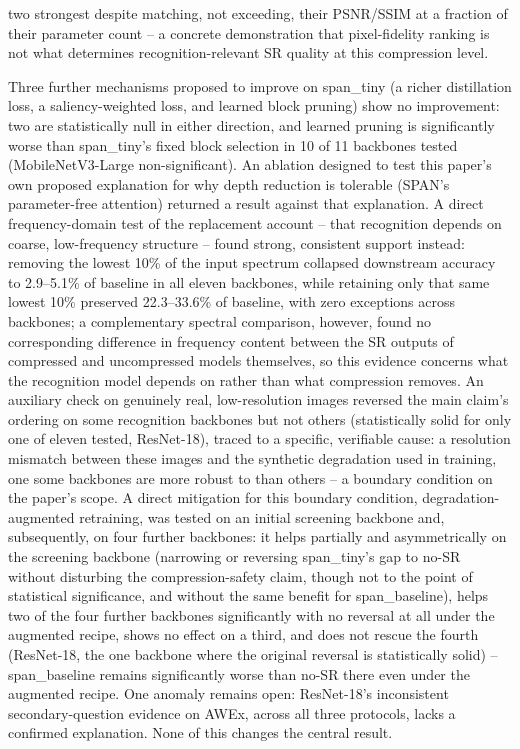 \documentclass[11pt]{article}
\begin{document}
two strongest despite matching, not exceeding, their PSNR/SSIM at a fraction of their parameter count -- a concrete demonstration that pixel-fidelity ranking is not what determines recognition-relevant SR quality at this compression level.

Three further mechanisms proposed to improve on span\_tiny (a richer distillation loss, a saliency-weighted loss, and learned block pruning) show no improvement: two are statistically null in either direction, and learned pruning is significantly worse than span\_tiny's fixed block selection in 10 of 11 backbones tested (MobileNetV3-Large non-significant). An ablation designed to test this paper's own proposed explanation for why depth reduction is tolerable (SPAN's parameter-free attention) returned a result against that explanation. A direct frequency-domain test of the replacement account -- that recognition depends on coarse, low-frequency structure -- found strong, consistent support instead: removing the lowest 10\% of the input spectrum collapsed downstream accuracy to 2.9--5.1\% of baseline in all eleven backbones, while retaining only that same lowest 10\% preserved 22.3--33.6\% of baseline, with zero exceptions across backbones; a complementary spectral comparison, however, found no corresponding difference in frequency content between the SR outputs of compressed and uncompressed models themselves, so this evidence concerns what the recognition model depends on rather than what compression removes. An auxiliary check on genuinely real, low-resolution images reversed the main claim's ordering on some recognition backbones but not others (statistically solid for only one of eleven tested, ResNet-18), traced to a specific, verifiable cause: a resolution mismatch between these images and the synthetic degradation used in training, one some backbones are more robust to than others -- a boundary condition on the paper's scope. A direct mitigation for this boundary condition, degradation-augmented retraining, was tested on an initial screening backbone and, subsequently, on four further backbones: it helps partially and asymmetrically on the screening backbone (narrowing or reversing span\_tiny's gap to no-SR without disturbing the compression-safety claim, though not to the point of statistical significance, and without the same benefit for span\_baseline), helps two of the four further backbones significantly with no reversal at all under the augmented recipe, shows no effect on a third, and does not rescue the fourth (ResNet-18, the one backbone where the original reversal is statistically solid) -- span\_baseline remains significantly worse than no-SR there even under the augmented recipe. One anomaly remains open: ResNet-18's inconsistent secondary-question evidence on AWEx, across all three protocols, lacks a confirmed explanation. None of this changes the central result.
\end{document}
